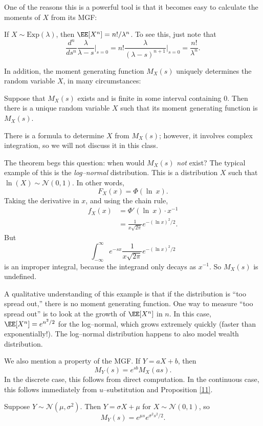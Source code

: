\documentclass{ximera}
\begin{document}
One of the reasons this is a powerful tool is that it becomes easy to calculate the moments of $X$ from its MGF:
\begin{example}
If $X\sim \mathrm{Exp}(\lambda)$, then $\EE[X^n] = n! /\lambda^n$. To see this, just note that
$$
\frac{d^n}{ds^n} \frac{\lambda}{\lambda -s} \Big|_{s=0} = n! \frac{\lambda}{(\lambda-s)^{n+1}} \Big|_{s=0} = \frac{n!}{\lambda^n}.
$$
\end{example}

In addition, the moment generating function $M_X(s)$ uniquely determines the random variable $X$, in many circumstances:
\begin{theorem}\label{MGF}
Suppose that $M_X(s)$ exists and is finite in some interval containing $0$. Then there is a unique random variable $X$ such that its moment generating function is $M_X(s)$.
\end{theorem}

There is a formula to determine $X$ from $M_X(s)$; however, it involves complex integration, so we will not discuss it in this class.

The theorem begs this question: when would $M_X(s)$ \textit{not} exist? The typical example of this is the \textit{log--normal} distribution. This is a distribution $X$ such that $\ln(X) \sim \mathcal{N}(0,1)$. In other words,
$$
F_X(x) = \Phi(\ln \ x).
$$
Taking the derivative in $x$, and using the chain rule, 
\begin{align*}
f_X(x) &= \Phi'(\ln \ x) \cdot x^{-1} \\
&= \frac{1}{x \sqrt{2\pi} }e^{-(\ln x)^2/2}.
\end{align*}
But 
$$
\int_{-\infty}^{\infty} e^{-sx} \frac{1}{x \sqrt{2\pi}} e^{-(\ln x)^2/2}
$$
is an improper integral, because the integrand only decays as $x^{-1}$. So $M_X(s)$ is undefined.

A qualitative understanding of this example is that if the distribution is ``too spread out,'' there is no moment generating function. One way to measure ``too spread out'' is to look at the growth of $\EE[X^n]$ in $n$. In this case, $\EE[X^n]=e^{n^2/2}$ for the log--normal, which grows extremely quickly (faster than exponentially!). The log--normal distribution happens to also model wealth distribution.

We also mention a property of the MGF. If $Y=aX+b$, then
\begin{equation}\label{Diff}
M_Y(s) = e^{sb}M_X(as).
\end{equation}
In the discrete case, this follows from direct computation. In the continuous case, this follows immediately from $u$--substitution and Proposition \ref{11}.
\begin{example}
Suppose $Y\sim \mathcal{N}(\mu,\sigma^2)$. Then $Y=\sigma X + \mu$ for $X \sim \mathcal{N}(0,1)$, so 
$$
M_Y(s) = e^{\mu s} e^{\sigma^2 s^2/2}.
$$
\end{example}
\end{document}
